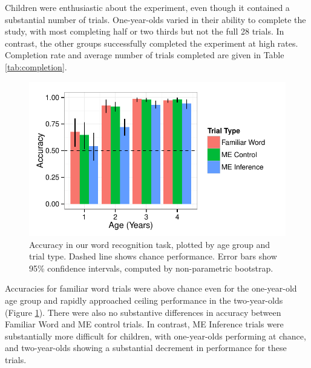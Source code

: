 \documentclass[man,noapacite]{apa2}
\begin{document}
Children were enthusiastic about the experiment, even though it contained a substantial number of trials. One-year-olds varied in their ability to complete the study, with most completing half or two thirds but not the full 28 trials. In contrast, the other groups successfully completed the experiment at high rates. Completion rate and average number of trials completed are given in Table \ref{tab:completion}.

\begin{figure}[t] 
  \begin{center} 
    \includegraphics[width=5in]{figures/accuracy.pdf} 
    \caption{\label{fig:accuracy} Accuracy in our word recognition task, plotted by age group and trial type. Dashed line shows chance performance. Error bars show 95\% confidence intervals, computed by non-parametric bootstrap. }
  \end{center} 
\end{figure}

Accuracies for familiar word trials were above chance even for the one-year-old age group and rapidly approached ceiling performance in the two-year-olds (Figure \ref{fig:accuracy}). There were also no substantive differences in accuracy between Familiar Word and ME control trials. In contrast, ME Inference trials were substantially more difficult for children, with one-year-olds performing at chance, and two-year-olds showing a substantial decrement in performance for these trials. 
\end{document}
